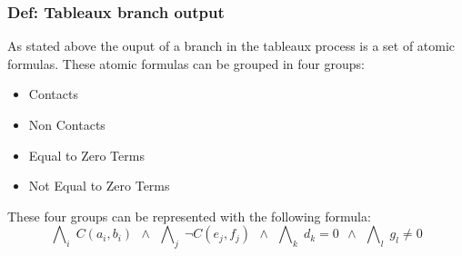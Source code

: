 \documentclass{article}
\begin{document}
			\subsubsection{Def: Tableaux branch output}
				As stated above the ouput of a branch in the tableaux process is a set of atomic formulas.
				These atomic formulas can be grouped in four groups:
				\begin{itemize}
					\item Contacts
					\item Non Contacts
					\item Equal to Zero Terms
					\item Not Equal to Zero Terms
				\end{itemize}
				These four groups can be represented with the following formula:
				\begin{equation}
					\bigwedge\nolimits_{i} \; C(a_i, b_i) \:\: \wedge \:\:
					\bigwedge\nolimits_{j} \; \neg C(e_j, f_j) \:\: \wedge \:\:
					\bigwedge\nolimits_{k} \; d_k = 0 \:\: \wedge \:\:
					\bigwedge\nolimits_{l} \; g_l \neq 0 
				\end{equation}
\end{document}
